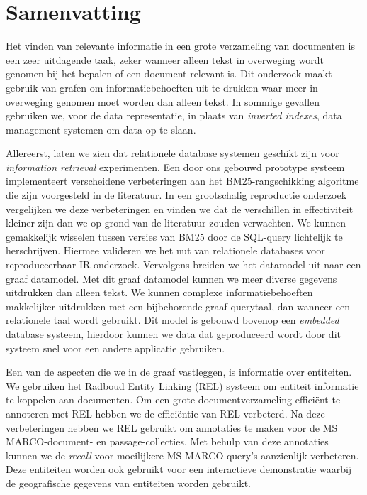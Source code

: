 \chapter*{Samenvatting}

Het vinden van relevante informatie in een grote verzameling van documenten is een zeer uitdagende taak, zeker wanneer alleen tekst in overweging wordt genomen bij het bepalen of een document relevant is. Dit onderzoek maakt gebruik van grafen om informatiebehoeften uit te drukken waar meer in overweging genomen moet worden dan alleen tekst. In sommige gevallen gebruiken we, voor de data representatie, in plaats van \emph{inverted indexes}, data management systemen om data op te slaan.

Allereerst, laten we zien dat relationele database systemen geschikt zijn voor \emph{information retrieval} experimenten.
Een door ons gebouwd prototype systeem implementeert verscheidene verbeteringen aan het BM25-rangschikking algoritme die zijn voorgesteld in de literatuur. In een grootschalig reproductie onderzoek vergelijken we deze verbeteringen en vinden we dat de verschillen in effectiviteit kleiner zijn dan we op grond van de literatuur zouden verwachten. 
We kunnen gemakkelijk wisselen tussen versies van BM25 door de SQL-query lichtelijk te herschrijven. Hiermee valideren we het nut van relationele databases voor reproduceerbaar IR-onderzoek.
Vervolgens breiden we het datamodel uit naar een graaf datamodel. Met dit graaf datamodel kunnen we meer diverse gegevens uitdrukken dan alleen tekst. 
We kunnen complexe informatiebehoeften makkelijker uitdrukken met een bijbehorende graaf querytaal, dan wanneer een relationele taal wordt gebruikt. Dit model is gebouwd bovenop een \emph{embedded} database systeem, hierdoor kunnen we data dat geproduceerd wordt door dit systeem snel voor een andere applicatie gebruiken.

Een van de aspecten die we in de graaf vastleggen, is informatie over entiteiten. We gebruiken het Radboud Entity Linking (REL) systeem om entiteit informatie te koppelen aan documenten. Om een grote documentverzameling efficiënt te annoteren met REL hebben we de efficiëntie van REL verbeterd. Na deze verbeteringen hebben we REL gebruikt om annotaties te maken voor de MS MARCO-document- en passage-collecties. Met behulp van deze annotaties kunnen we de \emph{recall} voor moeilijkere MS MARCO-query's aanzienlijk verbeteren. Deze entiteiten worden ook gebruikt voor een interactieve demonstratie waarbij de geografische gegevens van entiteiten worden gebruikt.
